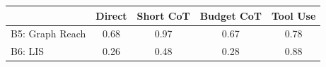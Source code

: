 \begin{tabular}{lcccc}
\toprule
 & Direct & Short CoT & Budget CoT & Tool Use \\
\midrule
B5: Graph Reach & 0.68 & 0.97 & 0.67 & 0.78 \\
B6: LIS & 0.26 & 0.48 & 0.28 & 0.88 \\
\bottomrule
\end{tabular}